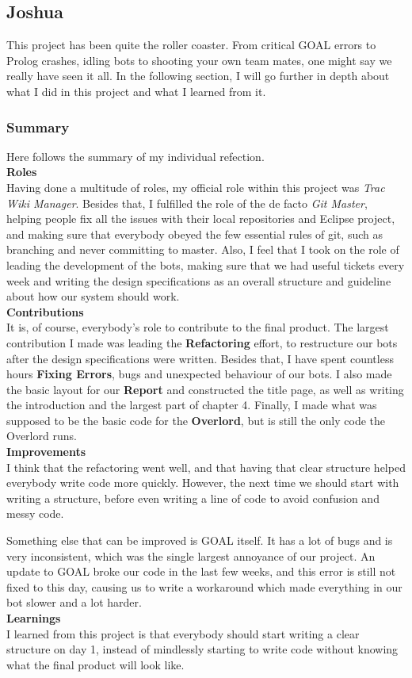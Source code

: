 \newpage
\subsection{Joshua}
This project has been quite the roller coaster. From critical GOAL errors to Prolog crashes, idling bots to shooting your own team mates, one might say we really have seen it all. In the following section, I will go further in depth about what I did in this project and what I learned from it.
\subsubsection{Summary}
Here follows the summary of my individual refection.
\\[2mm]\noindent
\textbf{Roles}\\
Having done a multitude of roles, my official role within this project was \emph{Trac Wiki Manager}. Besides that, I fulfilled the role of the de facto \emph{Git Master}, helping people fix all the issues with their local repositories and Eclipse project, and making sure that everybody obeyed the few essential rules of git, such as branching and never committing to master. Also, I feel that I took on the role of leading the development of the bots, making sure that we had useful tickets every week and writing the design specifications as an overall structure and guideline about how our system should work.
\\[2mm]\noindent
\textbf{Contributions}\\
It is, of course, everybody's role to contribute to the final product. The largest contribution I made was leading the \textbf{Refactoring} effort, to restructure our bots after the design specifications were written. Besides that, I have spent countless hours \textbf{Fixing Errors}, bugs and unexpected behaviour of our bots. I also made the basic layout for our \textbf{Report} and constructed the title page, as well as writing the introduction and the largest part of chapter 4. Finally, I made what was supposed to be the basic code for the \textbf{Overlord}, but is still the only code the Overlord runs.
\\[2mm]\noindent
\textbf{Improvements}\\
I think that the refactoring went well, and that having that clear structure helped everybody write code more quickly. However, the next time we should start with writing a structure, before even writing a line of code to avoid confusion and messy code.

Something else that can be improved is GOAL itself. It has a lot of bugs and is very inconsistent, which was the single largest annoyance of our project. An update to GOAL broke our code in the last few weeks, and this error is still not fixed to this day, causing us to write a workaround which made everything in our bot slower and a lot harder.
\\[2mm]\noindent
\textbf{Learnings}\\
I learned from this project is that everybody should start writing a clear structure on day 1, instead of mindlessly starting to write code without knowing what the final product will look like.

